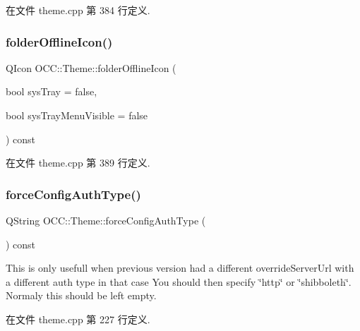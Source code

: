 在文件 theme.\+cpp 第 384 行定义.

\mbox{\label{class_o_c_c_1_1_theme_aff29313f1322b0d0039142dd3dee604d}} 
\subsubsection{\texorpdfstring{folder\+Offline\+Icon()}{folderOfflineIcon()}}
{\footnotesize\ttfamily Q\+Icon O\+C\+C\+::\+Theme\+::folder\+Offline\+Icon (\begin{DoxyParamCaption}\item[{bool}]{sys\+Tray = {\ttfamily false},  }\item[{bool}]{sys\+Tray\+Menu\+Visible = {\ttfamily false} }\end{DoxyParamCaption}) const\hspace{0.3cm}{\ttfamily [virtual]}}



在文件 theme.\+cpp 第 389 行定义.

\mbox{\label{class_o_c_c_1_1_theme_a51ae685be44e04fdc490e1986f2973ea}} 
\subsubsection{\texorpdfstring{force\+Config\+Auth\+Type()}{forceConfigAuthType()}}
{\footnotesize\ttfamily Q\+String O\+C\+C\+::\+Theme\+::force\+Config\+Auth\+Type (\begin{DoxyParamCaption}{ }\end{DoxyParamCaption}) const\hspace{0.3cm}{\ttfamily [virtual]}}

This is only usefull when previous version had a different override\+Server\+Url with a different auth type in that case You should then specify \char`\"{}http\char`\"{} or \char`\"{}shibboleth\char`\"{}. Normaly this should be left empty. 

在文件 theme.\+cpp 第 227 行定义.

\mbox{\label{class_o_c_c_1_1_theme_a289cecdb610b6c2590237301cb5eb69f}} 
